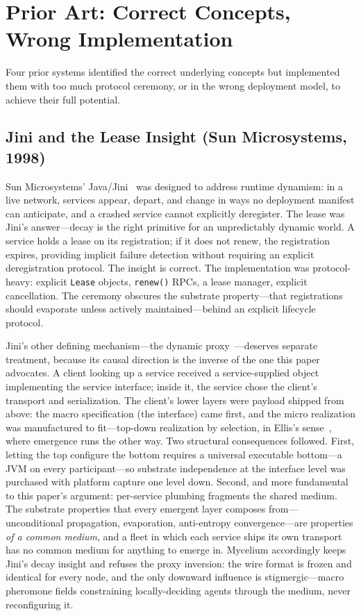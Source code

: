 \documentclass[11pt]{article}
\begin{document}
\section{Prior Art: Correct Concepts, Wrong Implementation}

Four prior systems identified the correct underlying concepts but implemented them
with too much protocol ceremony, or in the wrong deployment model, to achieve
their full potential.

\subsection{Jini and the Lease Insight (Sun Microsystems, 1998)}

Sun Microsystems' Java/Jini~\cite{jini-arch,jini-spec} was designed to address
runtime dynamism: in a live network, services appear, depart, and change in ways
no deployment manifest can anticipate, and a crashed service cannot explicitly
deregister. The lease was Jini's answer---decay is the right primitive for an
unpredictably dynamic world. A service holds a lease on its registration; if it
does not renew, the registration expires, providing implicit failure detection
without requiring an explicit deregistration protocol. The insight is correct.
The implementation was protocol-heavy: explicit \texttt{Lease} objects,
\texttt{renew()} RPCs, a lease manager, explicit cancellation. The ceremony
obscures the substrate property---that registrations should evaporate unless
actively maintained---behind an explicit lifecycle protocol.

Jini's other defining mechanism---the dynamic proxy~\cite{jini-arch}---deserves
separate treatment, because its causal direction is the inverse of the one this
paper advocates. A client looking up a service received a service-supplied
object implementing the service interface; inside it, the service chose the
client's transport and serialization. The client's lower layers were payload
shipped from above: the macro specification (the interface) came first, and the
micro realization was manufactured to fit---top-down realization by selection,
in Ellis's sense~\cite{ellis}, where emergence runs the other way. Two
structural consequences followed. First, letting the top configure the bottom
requires a universal executable bottom---a JVM on every participant---so
substrate independence at the interface level was purchased with platform
capture one level down. Second, and more fundamental to this paper's argument:
per-service plumbing fragments the shared medium. The substrate properties that
every emergent layer composes from---unconditional propagation, evaporation,
anti-entropy convergence---are properties \emph{of a common medium}, and a
fleet in which each service ships its own transport has no common medium for
anything to emerge in. Mycelium accordingly keeps Jini's decay insight and
refuses the proxy inversion: the wire format is frozen and identical for every
node, and the only downward influence is stigmergic---macro pheromone fields
constraining locally-deciding agents through the medium, never reconfiguring it.
\end{document}
